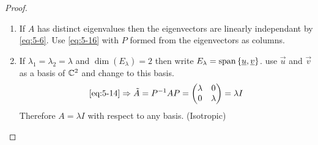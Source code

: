 \documentclass{article}
\numberwithin{equation}{section}
\begin{document}
\begin{proof}\leavevmode
    \begin{enumerate}
        \item If $A$ has distinct eigenvalues then the eigenvectors are linearly independant by \eqref{eq:5-6}.
        Use \eqref{eq:5-16} with $P$ formed from the eigenvectors as columns.
        
        \item If $\lambda_1 = \lambda_2 = \lambda$ and $\dim(E_\lambda) = 2$ then write $E_\lambda = \operatorname{span} \left\{ \underline{u}, \underline{v} \right\}$.
        use $\vec u$ and $\vec v$ as a basis of $\mathbb{C}^2$ and change to this basis.
        \[
            \text{\eqref{eq:5-14}} \Rightarrow \tilde{A} = P^{-1} A P = \begin{pmatrix}
                \lambda & 0 \\
                0 & \lambda
            \end{pmatrix} = \lambda I
        \]
        Therefore $A = \lambda I$ with respect to any basis. (Isotropic)
        

\end{enumerate}
\end{proof}
\end{document}
